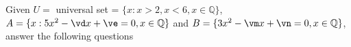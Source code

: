 

\EXPR[0]\vd{\vb + (\va*\vc)}
\MULTIPLY\va\vb\ve
\EXPR[0]\vm{\vg + (\vh*\va)}
\MULTIPLY\va\vg\vn

\question Given $U=$ universal set = $\lbrace x : x > 2, x < 6, x\in\mathbb{Q}\rbrace$, 
$A=\lbrace x : \vc x^2 - \vd x + \ve = 0, x \in \mathbb{Q} \rbrace$ 
and $B=\lbrace \vh x^2 - \vm x + \vn = 0, x\in\mathbb{Q} \rbrace$, answer the following questions

\watchout

